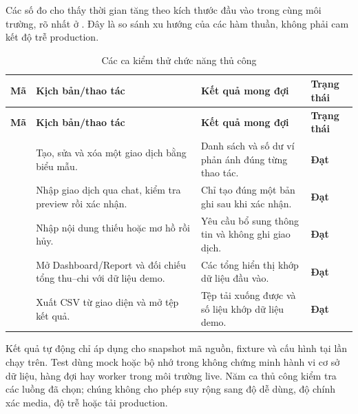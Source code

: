 Các số đo cho thấy thời gian tăng theo kích thước đầu vào trong cùng môi trường, rõ nhất ở . Đây là so sánh xu hướng của các hàm thuần, không phải cam kết độ trễ production.
\begin{longtable}{@{}L{1.5cm}L{4.6cm}L{6.5cm}C{1.5cm}@{}}
  \caption{Các ca kiểm thử chức năng thủ công}\label{tab:manual-test-cases}\\
  \toprule
  \textbf{Mã} & \textbf{Kịch bản/thao tác} & \textbf{Kết quả mong đợi} & \textbf{Trạng thái} \\
  \midrule
  \endfirsthead
  \toprule
  \textbf{Mã} & \textbf{Kịch bản/thao tác} & \textbf{Kết quả mong đợi} & \textbf{Trạng thái} \\
  \midrule
  \endhead
   & Tạo, sửa và xóa một giao dịch bằng biểu mẫu. & Danh sách và số dư ví phản ánh đúng từng thao tác. & \textbf{Đạt} \\
   & Nhập giao dịch qua chat, kiểm tra preview rồi xác nhận. & Chỉ tạo đúng một bản ghi sau khi xác nhận. & \textbf{Đạt} \\
   & Nhập nội dung thiếu hoặc mơ hồ rồi hủy. & Yêu cầu bổ sung thông tin và không ghi giao dịch. & \textbf{Đạt} \\
   & Mở Dashboard/Report và đối chiếu tổng thu--chi với dữ liệu demo. & Các tổng hiển thị khớp dữ liệu đầu vào. & \textbf{Đạt} \\
   & Xuất CSV từ giao diện và mở tệp kết quả. & Tệp tải xuống được và số liệu khớp dữ liệu demo. & \textbf{Đạt} \\
  \bottomrule
\end{longtable}

Kết quả tự động chỉ áp dụng cho snapshot mã nguồn, fixture và cấu hình tại lần chạy trên. Test dùng mock hoặc bộ nhớ trong không chứng minh hành vi cơ sở dữ liệu, hàng đợi hay worker trong môi trường live. Năm ca thủ công kiểm tra các luồng đã chọn; chúng không cho phép suy rộng sang độ dễ dùng, độ chính xác media, độ trễ hoặc tải production.
